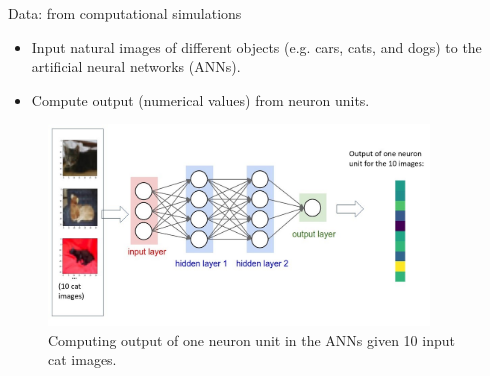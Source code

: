 \documentclass[xcolor={dvipsnames,svgnames}]{beamer}
\begin{document}
\begin{frame}{Data: from computational simulations}
    \begin{itemize}
        \item Input natural images of different objects (e.g. cars, cats, and dogs) to the artificial neural networks (ANNs).
        \item Compute output (numerical values) from neuron units.
    \end{itemize}
    \begin{figure}
        \centering
            \includegraphics[width=0.9\textwidth]{Slide1.jpg}
            \caption{Computing output of one neuron unit in the ANNs given 10 input cat images.}
    \end{figure}
    
\end{frame}

        
        
        
        
        
\end{document}
